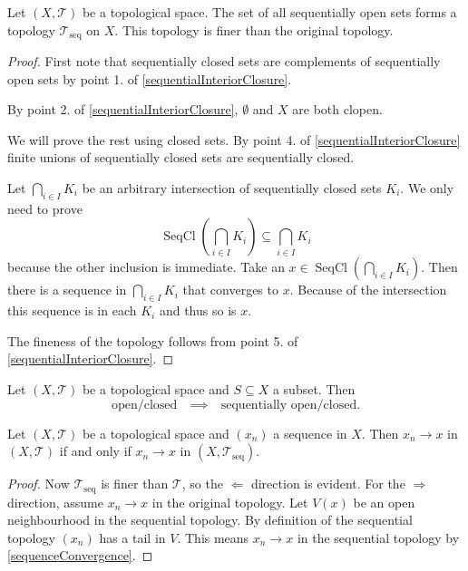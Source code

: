\begin{proposition} \label{sequentialTopology}
Let $(X,\mathcal{T})$ be a topological space. The set of all sequentially open sets forms a topology $\mathcal{T}_\text{seq}$ on $X$. This topology is finer than the original topology.
\end{proposition}
\begin{proof}
First note that sequentially closed sets are complements of sequentially open sets by point 1. of \ref{sequentialInteriorClosure}.

By point 2. of \ref{sequentialInteriorClosure}, $\emptyset$ and $X$ are both clopen.

We will prove the rest using closed sets. By point 4. of \ref{sequentialInteriorClosure} finite unions of sequentially closed sets are sequentially closed.

Let $\bigcap_{i\in I}K_i$ be an arbitrary intersection of sequentially closed sets $K_i$. We only need to prove
\[ \operatorname{SeqCl}\left(\bigcap_{i\in I}K_i\right) \subseteq \bigcap_{i\in I}K_i \]
because the other inclusion is immediate. Take an $x\in \operatorname{SeqCl}\left(\bigcap_{i\in I}K_i\right)$. Then there is a sequence in $\bigcap_{i\in I}K_i$ that converges to $x$. Because of the intersection this sequence is in each $K_i$ and thus so is $x$.

The fineness of the topology follows from point 5. of \ref{sequentialInteriorClosure}.
\end{proof}
\begin{corollary}
Let $(X,\mathcal{T})$ be a topological space and $S\subseteq X$  a subset. Then
\[ \text{open/closed} \quad\implies\quad \text{sequentially open/closed.} \]
\end{corollary}

\begin{proposition} \label{sequentialTopologySameConvergentSequences}
Let $(X,\mathcal{T})$ be a topological space and $(x_n)$ a sequence in $X$. Then $x_n\to x$ in $(X,\mathcal{T})$ \textup{if and only if} $x_n\to x$ in $(X,\mathcal{T}_\text{seq})$.
\end{proposition}
\begin{proof}
Now $\mathcal{T}_\text{seq}$ is finer than $\mathcal{T}$, so the $\Leftarrow$ direction is evident. For the $\Rightarrow$ direction, assume $x_n\to x$ in the original topology. Let $V(x)$ be an open neighbourhood in the sequential topology. By definition of the sequential topology $(x_n)$ has a tail in $V$. This means $x_n\to x$ in the sequential topology by \ref{sequenceConvergence}.
\end{proof}

